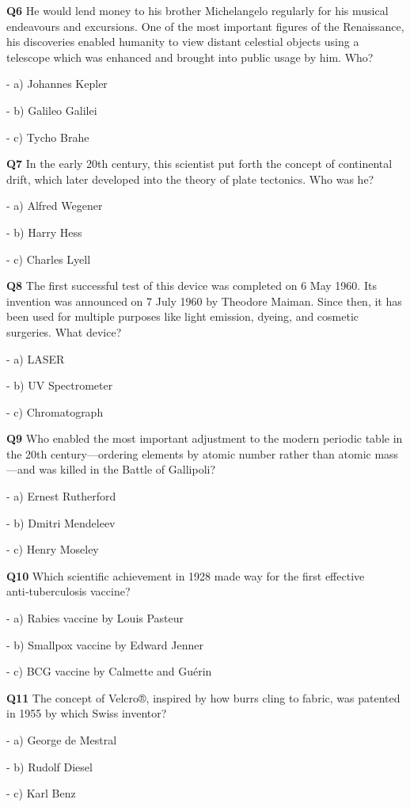 \textbf{Q6} He would lend money to his brother Michelangelo regularly for his musical endeavours and excursions. One of the most important figures of the Renaissance, his discoveries enabled humanity to view distant celestial objects using a telescope which was enhanced and brought into public usage by him. Who?\par
\quad - a) Johannes Kepler\par
\quad - b) Galileo Galilei\par
\quad - c) Tycho Brahe\par

\textbf{Q7} In the early 20th century, this scientist put forth the concept of continental drift, which later developed into the theory of plate tectonics. Who was he?\par
\quad - a) Alfred Wegener\par
\quad - b) Harry Hess\par
\quad - c) Charles Lyell\par

\textbf{Q8} The first successful test of this device was completed on 6 May 1960. Its invention was announced on 7 July 1960 by Theodore Maiman. Since then, it has been used for multiple purposes like light emission, dyeing, and cosmetic surgeries. What device?\par
\quad - a) LASER\par
\quad - b) UV Spectrometer\par
\quad - c) Chromatograph\par

\textbf{Q9} Who enabled the most important adjustment to the modern periodic table in the 20th century—ordering elements by atomic number rather than atomic mass—and was killed in the Battle of Gallipoli?\par
\quad - a) Ernest Rutherford\par
\quad - b) Dmitri Mendeleev\par
\quad - c) Henry Moseley\par

\textbf{Q10} Which scientific achievement in 1928 made way for the first effective anti‑tuberculosis vaccine?\par
\quad - a) Rabies vaccine by Louis Pasteur\par
\quad - b) Smallpox vaccine by Edward Jenner\par
\quad - c) BCG vaccine by Calmette and Guérin\par

\textbf{Q11} The concept of Velcro®, inspired by how burrs cling to fabric, was patented in 1955 by which Swiss inventor?\par
\quad - a) George de Mestral\par
\quad - b) Rudolf Diesel\par
\quad - c) Karl Benz\par

